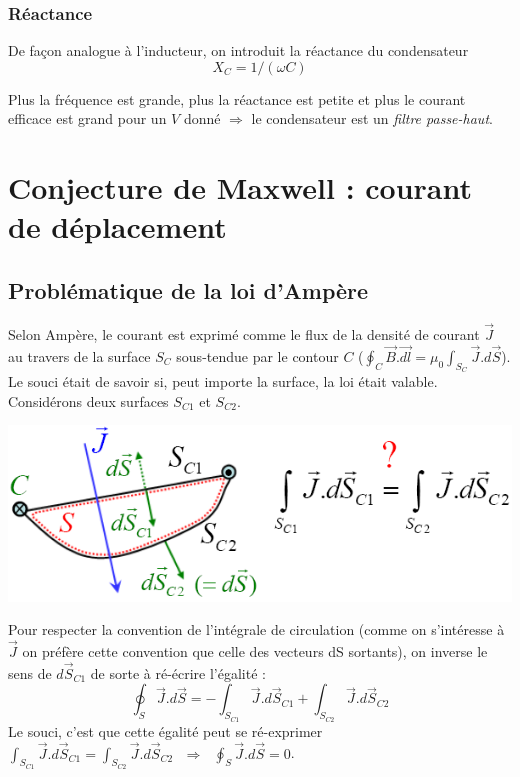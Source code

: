 \documentclass	[11pt, a4paper, openany]{book}
\begin{document}
\subsubsection*{Réactance}
De façon analogue à l'inducteur, on introduit la réactance du condensateur \begin{equation}
X_C = 1/(\omega C)
\end{equation}

Plus la fréquence est grande, plus la réactance est petite et plus le courant efficace est grand pour un $V$ donné $\Rightarrow$ le condensateur est un \textit{filtre passe-haut}.

\section{Conjecture de Maxwell : courant de déplacement}
\subsection{Problématique de la loi d'Ampère}
Selon Ampère, le courant est exprimé comme le flux de la densité de courant $\vec{J}$ au travers de la surface $S_C$ sous-tendue par le contour $C$ ($\oint_C \vec{B}.\vec{dl} = \mu_0 \int_{S_C} \vec{J}.d\vec{S}$).\\
Le souci était de savoir si, peut importe la surface, la loi était valable. Considérons deux surfaces $S_{C1}$ et $S_{C2}$.

\begin{center}
\includegraphics[scale=0.55]{em/image27.png}\\
\end{center}
Pour respecter la convention de l'intégrale de circulation (comme on s'intéresse à $\vec{J}$ on préfère cette convention que celle des vecteurs dS sortants), on inverse le sens de $d\vec{S}_{C1}$ de sorte à ré-écrire l'égalité :
\begin{equation}
\oint_S \vec{J}.d\vec{S} = - \int_{S_{C1}} \vec{J}.d\vec{S}_{C1} + \int_{S_{C2}} \vec{J}.d\vec{S}_{C2} 
\end{equation}
Le souci, c'est que cette égalité peut se ré-exprimer  $\int_{S_{C1}} \vec{J}.d\vec{S}_{C1} = \int_{S_{C2}} \vec{J}.d\vec{S}_{C2}\ \ \ \Rightarrow\ \ \ \oint_S \vec{J}.d\vec{S} = 0$.\\
\end{document}
